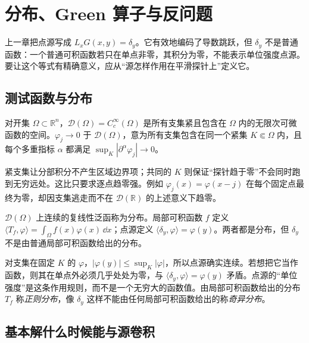 \chapter{分布、Green 算子与反问题}
\label{chap:math-distributions}

上一章把点源写成 \(L_xG(x,y)=\delta_y\)。它有效地编码了导数跳跃，但 \(\delta_y\) 不是普通函数：一个普通可积函数若只在单点非零，其积分为零，不能表示单位强度点源。要让这个等式有精确意义，应从“源怎样作用在平滑探针上”定义它。

\section{测试函数与分布}

\begin{definition}[测试函数和收敛]
对开集 \(\Omega\subset\mathbb R^n\)，\(\mathcal D(\Omega)=C_c^\infty(\Omega)\) 是所有支集紧且包含在 \(\Omega\) 内的无限次可微函数的空间。\(\varphi_j\to0\) 于 \(\mathcal D(\Omega)\)，意为所有支集包含在同一个紧集 \(K\Subset\Omega\) 内，且每个多重指标 \(\alpha\) 都满足 \(\sup_K|\partial^\alpha\varphi_j|\to0\)。
\end{definition}

紧支集让分部积分不产生区域边界项；共同的 \(K\) 则保证“探针趋于零”不会同时跑到无穷远处。这比只要求逐点趋零强。例如 \(\varphi_j(x)=\varphi(x-j)\) 在每个固定点最终为零，却因支集逃走而不在 \(\mathcal D(\mathbb R)\) 的上述意义下趋零。

\begin{definition}[分布]
\(\mathcal D(\Omega)\) 上连续的复线性泛函称为分布。局部可积函数 \(f\) 定义 \(\langle T_f,\varphi\rangle=\int_\Omega f(x)\varphi(x)\,\dd x\)；点源定义 \(\langle\delta_y,\varphi\rangle=\varphi(y)\)。两者都是分布，但 \(\delta_y\) 不是由普通局部可积函数给出的分布。
\end{definition}

对支集在固定 \(K\) 的 \(\varphi\)，\(|\varphi(y)|\le\sup_K|\varphi|\)，所以点源确实连续。若想把它当作函数，则其在单点外必须几乎处处为零，与 \(\langle\delta_y,\varphi\rangle=\varphi(y)\) 矛盾。点源的“单位强度”是这条作用规则，而不是一个无穷大的函数值。由局部可积函数给出的分布 \(T_f\) 称\emph{正则分布}，像 \(\delta_y\) 这样不能由任何局部可积函数给出的称\emph{奇异分布}。




\section{基本解什么时候能与源卷积}

